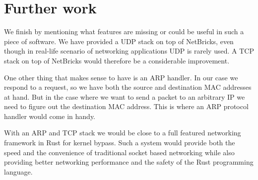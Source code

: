 \documentclass[11pt]{book}
\begin{document}
\section{Further work}

We finish by mentioning what features are missing or could be useful
in such a piece of software. We have provided a UDP stack on top of
NetBricks, even though in real-life scenario of networking
applications UDP is rarely used. A TCP stack on top of NetBricks would
therefore be a considerable improvement.

One other thing that makes sense to have is an ARP handler. In our
case we respond to a request, so we have both the source and
destination MAC addresses at hand. But in the case where we want to
send a packet to an arbitrary IP we need to figure out the destination
MAC address. This is where an ARP protocol handler would come in
handy. 

With an ARP and TCP stack we would be close to a full featured
networking framework in Rust for kernel bypass. Such a system would
provide both the speed and the convenience of traditional socket based
networking while also providing better networking performance and the
safety of the Rust programming language. 


{}
\end{document}
